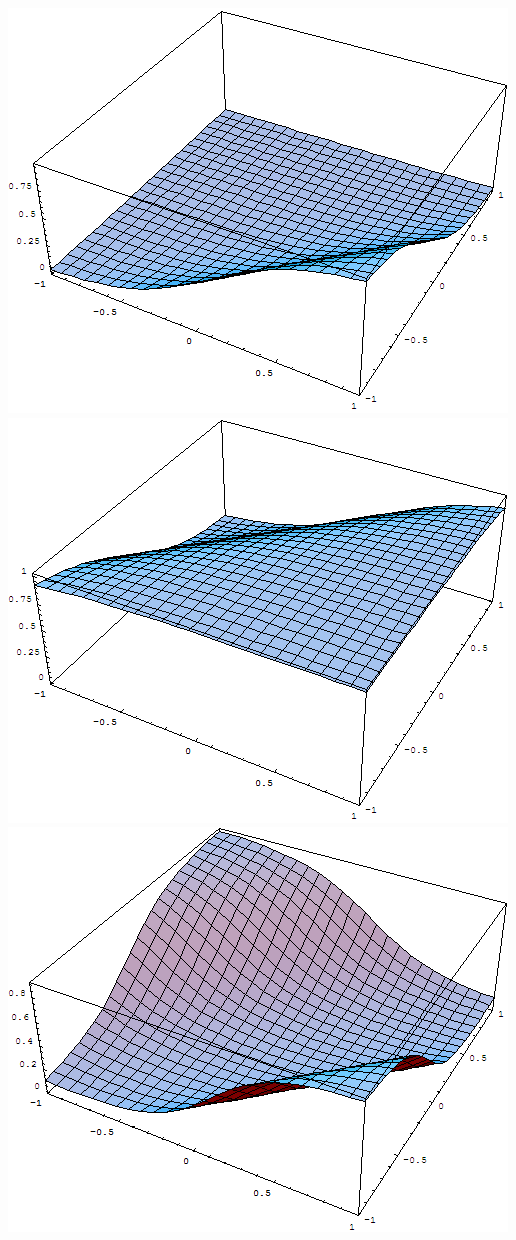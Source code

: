 \documentclass{article}
\begin{document}
\begin{enumerate}
    \begin{center}
      \includegraphics[scale=.3]{hidden1.png}
      \includegraphics[scale=.3]{hidden2.png}
      \includegraphics[scale=.3]{output.png}
    \end{center}


\end{enumerate}
\end{document}
